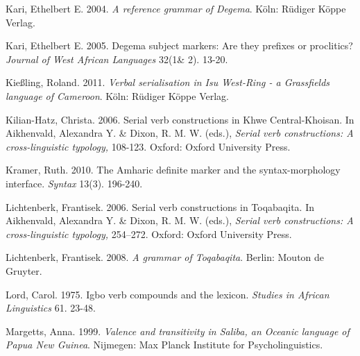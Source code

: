 \documentclass[output=paper]{langsci/langscibook}
\begin{document}
\begin{styleNoSpacing}
Kari, Ethelbert E. 2004. \textit{A reference grammar of Degema}. Köln: Rüdiger Köppe Verlag.
\end{styleNoSpacing}

\begin{styleNoSpacing}
Kari, Ethelbert E. 2005. Degema subject markers: Are they prefixes or proclitics? \textit{Journal of West African Languages} 32(1\& 2). 13-20.
\end{styleNoSpacing}

\begin{styleNoSpacing}
Kießling, Roland. 2011. \textit{Verbal serialisation in Isu West-Ring - a Grassfields language of Cameroon}. Köln: Rüdiger Köppe Verlag.
\end{styleNoSpacing}

\begin{styleNoSpacing}
Kilian-Hatz, Christa. 2006. Serial verb constructions in Khwe Central-Khoisan. In Aikhenvald, Alexandra Y. \& Dixon, R. M. W. (eds.), \textit{Serial verb constructions: A cross-linguistic typology, }108-123. Oxford: Oxford University Press.
\end{styleNoSpacing}

\begin{styleNoSpacing}
Kramer, Ruth. 2010. The Amharic definite marker and the syntax-morphology interface. \textit{Syntax} 13(3). 196-240.
\end{styleNoSpacing}

\begin{styleNoSpacing}
Lichtenberk, Frantisek. 2006. Serial verb constructions in Toqabaqita. In Aikhenvald, Alexandra Y. \& Dixon, R. M. W. (eds.), \textit{Serial verb constructions: A cross-linguistic typology,} 254–272. Oxford: Oxford University Press.
\end{styleNoSpacing}

\begin{styleNoSpacing}
Lichtenberk, Frantisek. 2008. \textit{A grammar of Toqabaqita}. Berlin: Mouton de Gruyter. 
\end{styleNoSpacing}

\begin{styleNoSpacing}
Lord, Carol. 1975. Igbo verb compounds and the lexicon. \textit{Studies in African Linguistics} 61. 23-48.
\end{styleNoSpacing}

\begin{styleNoSpacing}
Margetts, Anna. 1999. \textit{Valence and transitivity in Saliba, an Oceanic language of Papua New Guinea}. Nijmegen: Max Planck Institute for Psycholinguistics.
\end{styleNoSpacing}
\end{document}
